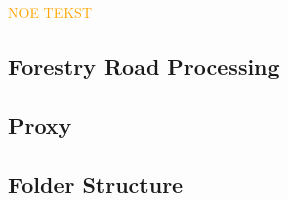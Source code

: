 \textcolor{orange}{NOE TEKST}

\subsection{Forestry Road Processing}

\subsection{Proxy}




\subsection{Folder Structure}



